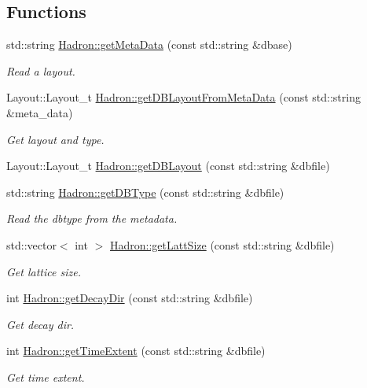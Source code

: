\subsection*{Functions}
\begin{DoxyCompactItemize}
\item 
std\+::string \mbox{\hyperlink{namespaceHadron_a6c9f3d44d269357faf4d786cc73ec742}{Hadron\+::get\+Meta\+Data}} (const std\+::string \&dbase)
\begin{DoxyCompactList}\small\item\em Read a layout. \end{DoxyCompactList}\item 
Layout\+::\+Layout\+\_\+t \mbox{\hyperlink{namespaceHadron_a5f888183d0cbdadea2ebdf51020f5042}{Hadron\+::get\+D\+B\+Layout\+From\+Meta\+Data}} (const std\+::string \&meta\+\_\+data)
\begin{DoxyCompactList}\small\item\em Get layout and type. \end{DoxyCompactList}\item 
Layout\+::\+Layout\+\_\+t \mbox{\hyperlink{namespaceHadron_af18d764aba83c32e26a22d75ed2dfbf7}{Hadron\+::get\+D\+B\+Layout}} (const std\+::string \&dbfile)
\item 
std\+::string \mbox{\hyperlink{namespaceHadron_a82284ec1545a1a6b6794da8d973a1d57}{Hadron\+::get\+D\+B\+Type}} (const std\+::string \&dbfile)
\begin{DoxyCompactList}\small\item\em Read the dbtype from the metadata. \end{DoxyCompactList}\item 
std\+::vector$<$ int $>$ \mbox{\hyperlink{namespaceHadron_aa639c858514f322eb7ee4c074924746a}{Hadron\+::get\+Latt\+Size}} (const std\+::string \&dbfile)
\begin{DoxyCompactList}\small\item\em Get lattice size. \end{DoxyCompactList}\item 
int \mbox{\hyperlink{namespaceHadron_ae5c5e7cd57aa116ce56262bf00762610}{Hadron\+::get\+Decay\+Dir}} (const std\+::string \&dbfile)
\begin{DoxyCompactList}\small\item\em Get decay dir. \end{DoxyCompactList}\item 
int \mbox{\hyperlink{namespaceHadron_a660c9f3adc1525c9d326b23398d09494}{Hadron\+::get\+Time\+Extent}} (const std\+::string \&dbfile)
\begin{DoxyCompactList}\small\item\em Get time extent. \end{DoxyCompactList}\end{DoxyCompactItemize}
